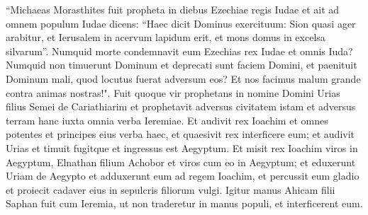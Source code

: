 \begin{biblechapter}
\verse “Michaeas Morasthites fuit propheta in diebus Ezechiae regis Iudae et ait ad omnem populum Iudae dicens: “Haec dicit Dominus exercituum: Sion quasi ager arabitur, et Ierusalem in acervum lapidum erit, et mons domus in excelsa silvarum”. 
\verse Numquid morte condemnavit eum Ezechias rex Iudae et omnis Iuda? Numquid non timuerunt Dominum et deprecati sunt faciem Domini, et paenituit Dominum mali, quod locutus fuerat adversum eos? Et nos facimus malum grande contra animas nostras!". 
\verse Fuit quoque vir prophetans in nomine Domini Urias filius Semei de Cariathiarim et prophetavit adversus civitatem istam et adversus terram hanc iuxta omnia verba Ieremiae. 
\verse Et audivit rex Ioachim et omnes potentes et principes eius verba haec, et quaesivit rex interficere eum; et audivit Urias et timuit fugitque et ingressus est Aegyptum. 
\verse Et misit rex Ioachim viros in Aegyptum, Elnathan filium Achobor et viros cum eo in Aegyptum; 
\verse et eduxerunt Uriam de Aegypto et adduxerunt eum ad regem Ioachim, et percussit eum gladio et proiecit cadaver eius in sepulcris filiorum vulgi. 
\verse Igitur manus Ahicam filii Saphan fuit cum Ieremia, ut non traderetur in manus populi, et interficerent eum. 
\end{biblechapter}

